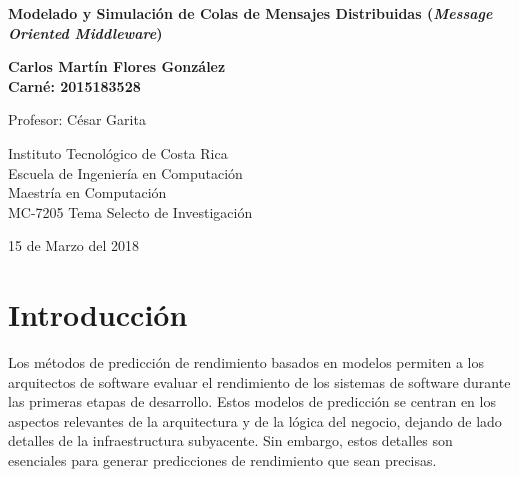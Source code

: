 \documentclass[11pt, twoside]{report}
\begin{document}
  
 


\begin{titlepage}
    \begin{center}
        \vspace*{1cm}
        
        \Huge
        \textbf{Modelado y Simulación de Colas de Mensajes Distribuidas (\emph{Message Oriented Middleware})}
        
        \vspace{1.5cm}
        
        \textbf{Carlos Martín Flores González\\ \textnormal{\small{Carné: 2015183528}}}
        
        \vfill
        
        Profesor: César Garita
        
        
        
        \Large
        Instituto Tecnológico de Costa Rica\\
        Escuela de Ingeniería en Computación\\
        Maestría en Computación\\
        MC-7205 Tema Selecto de Investigación
        
        \vfill
        
        15 de Marzo del 2018
        
        
        
    \end{center}
\end{titlepage}





\setcounter{page}{1}
\tableofcontents
\clearpage

%









\chapter*{Introducción}
Los métodos de predicción de rendimiento basados en modelos permiten a los arquitectos de software evaluar el rendimiento de los sistemas de software durante las primeras etapas de desarrollo. Estos modelos de predicción se centran en los aspectos relevantes de la arquitectura y de la lógica del negocio, dejando de lado detalles de la infraestructura subyacente. Sin embargo, estos detalles son esenciales para generar predicciones de rendimiento que sean precisas.
\end{document}
